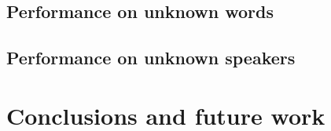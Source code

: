 \documentclass[a4paper]{article}
\begin{document}
		\subsection{Performance on unknown words}
		\subsection{Performance on unknown speakers}
	



	\section{Conclusions and future work}
	\label{sec:conc}
	



  



  \eightpt
  

  

\end{document}
